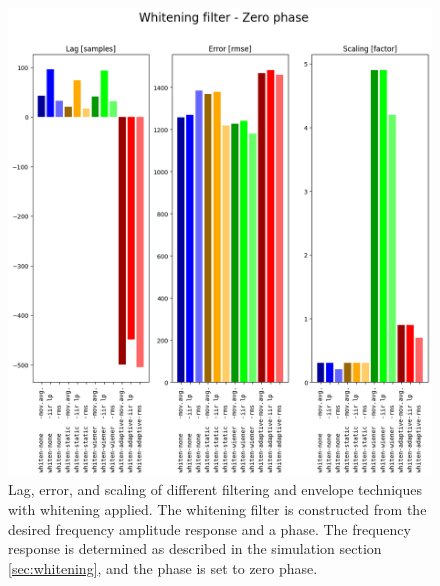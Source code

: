 \begin{figure}[h!t]
	\begin{center}
		\includegraphics[width=1.0\columnwidth]{images/result_whitening_zerophase.png}
	\end{center}
	\caption{Lag, error, and scaling of different filtering and envelope techniques with whitening applied. The whitening filter is constructed from the desired frequency amplitude response and a phase. The frequency response is determined as described in the simulation section \ref{sec:whitening}, and the phase is set to zero phase. }
	\label{fig:result_whitening_zerophase}
\end{figure}